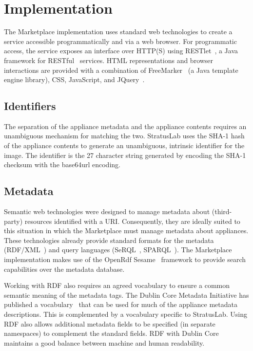 \section{Implementation}
\label{sec:implementation}

The Marketplace implementation uses standard web technologies to
create a service accessible programmatically and via a web browser.
For programmatic access, the service exposes an interface over HTTP(S)
using RESTlet~\cite{restlet}, a Java framework for RESTful~\cite{rest}
services.  HTML representations and browser interactions are provided
with a combination of FreeMarker~\cite{freemarker} (a Java template
engine library), CSS, JavaScript, and JQuery~\cite{jquery}.

\subsection{Identifiers}

The separation of the appliance metadata and the appliance contents
requires an unambiguous mechanism for matching the two.  StratusLab
uses the SHA-1 hash of the appliance contents to generate an
unambiguous, intrinsic identifier for the image.  The identifier is
the 27 character string generated by encoding the SHA-1 checksum with
the base64url encoding.

\subsection{Metadata}

Semantic web technologies were designed to manage metadata about
(third-party) resources identified with a URI\@.  Consequently, they
are ideally suited to this situation in which the Marketplace must
manage metadata about appliances.  These technologies already provide
standard formats for the metadata (RDF/XML~\cite{rdfxml, rdfprimer,
  rdfschema}) and query languages (SeRQL~\cite{serql},
SPARQL~\cite{sparql}).  The Marketplace implementation makes use of
the OpenRdf Sesame~\cite{sesame} framework to provide search
capabilities over the metadata database.

Working with RDF also requires an agreed vocabulary to ensure a common
semantic meaning of the metadata tags.  The Dublin Core Metadata
Initiative has published a vocabulary~\cite{dcterms} that can be used
for much of the appliance metadata descriptions.  This is complemented
by a vocabulary specific to StratusLab\@.  Using RDF also allows
additional metadata fields to be specified (in separate namespaces) to
complement the standard fields. RDF with Dublin Core maintains a good
balance between machine and human readability.

